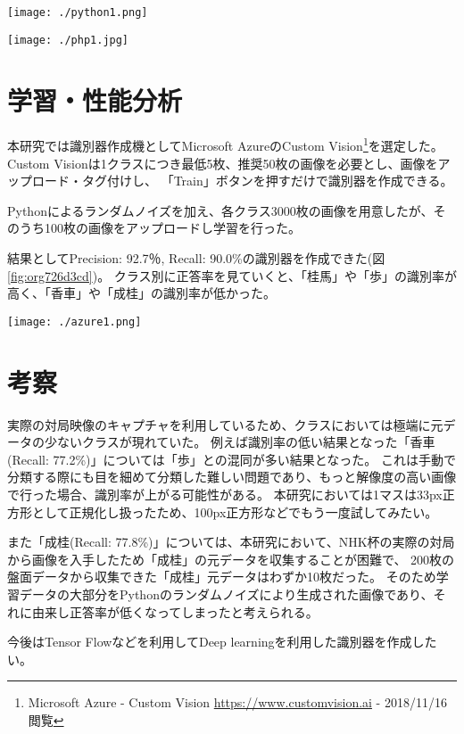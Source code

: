 \documentclass[uplatex, dvipdfmx]{jsarticle}
\begin{document}
\begin{multicols*}{2}
\begin{center}
\texttt{[image: ./python1.png]}
\end{center}

\begin{center}
\texttt{[image: ./php1.jpg]}
\end{center}
\section{学習・性能分析}
\label{sec:org02f7198}
本研究では識別器作成機としてMicrosoft AzureのCustom Vision\footnote{Microsoft Azure - Custom Vision
\url{https://www.customvision.ai} - 2018/11/16 閲覧}を選定した。
Custom Visionは1クラスにつき最低5枚、推奨50枚の画像を必要とし、画像をアップロード・タグ付けし、
「Train」ボタンを押すだけで識別器を作成できる。

Pythonによるランダムノイズを加え、各クラス3000枚の画像を用意したが、そのうち100枚の画像をアップロードし学習を行った。

結果としてPrecision: 92.7％, Recall: 90.0\%の識別器を作成できた(図\ref{fig:org726d3cd})。
クラス別に正答率を見ていくと、「桂馬」や「歩」の識別率が高く、「香車」や「成桂」の識別率が低かった。

\begin{center}
\texttt{[image: ./azure1.png]}
\end{center}
\section{考察}
\label{sec:org35035a5}
実際の対局映像のキャプチャを利用しているため、クラスにおいては極端に元データの少ないクラスが現れていた。
例えば識別率の低い結果となった「香車(Recall: 77.2\%)」については「歩」との混同が多い結果となった。
これは手動で分類する際にも目を細めて分類した難しい問題であり、もっと解像度の高い画像で行った場合、識別率が上がる可能性がある。
本研究においては1マスは33px正方形として正規化し扱ったため、100px正方形などでもう一度試してみたい。

また「成桂(Recall: 77.8\%)」については、本研究において、NHK杯の実際の対局から画像を入手したため「成桂」の元データを収集することが困難で、
200枚の盤面データから収集できた「成桂」元データはわずか10枚だった。
そのため学習データの大部分をPythonのランダムノイズにより生成された画像であり、それに由来し正答率が低くなってしまったと考えられる。

今後はTensor Flowなどを利用してDeep learningを利用した識別器を作成したい。
\end{multicols*}
\end{document}
